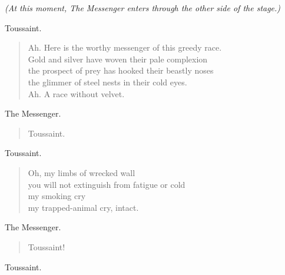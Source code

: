 \documentclass[letterpaper,article,12pt,oneside,notitlepage]{memoir}
\begin{document}
\textit{(At this moment, The Messenger enters through the other side of the stage.)}

\begin{center}Toussaint.\end{center}

\begin{verse}
Ah. Here is the worthy messenger of this greedy race. \\
Gold and silver have woven their pale complexion \\
the prospect of prey has hooked their beastly noses \\
the glimmer of steel nests in their cold eyes. \\
Ah. A race without velvet. \\
\end{verse}

\begin{center}The Messenger.\end{center}

\begin{verse}
Toussaint. \\
\end{verse}

\begin{center}Toussaint.\end{center}

\begin{verse}
Oh, my limbs of wrecked wall \\
you will not extinguish from fatigue or cold \\
my smoking cry \\
my trapped-animal cry, intact. \\
\end{verse}

\begin{center}The Messenger.\end{center}

\begin{verse}
Toussaint! \\
\end{verse}

\begin{center}Toussaint.\end{center}
\end{document}
